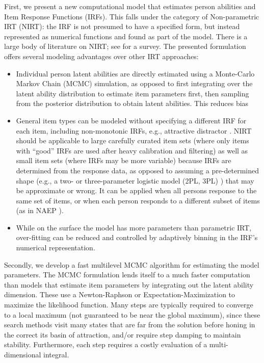 \documentclass{article}
\begin{document}
First, we present a new computational model that estimates person abilities and Item Response Functions (IRFs). This falls under the category of Non-parametric IRT (NIRT): the IRF is not presumed to have a specified form, but instead represented as numerical functions and found as part of the model. There is a large body of literature on NIRT; see \cite{sijtsma} for a survey. The presented formulation offers several modeling advantages over other IRT approaches:
\begin{itemize}
	\item Individual person latent abilities are directly estimated using a Monte-Carlo 
	Markov Chain (MCMC) simulation, as opposed to first integrating over the latent ability distribution to estimate item parameters first, then sampling from the posterior distribution to obtain latent abilities. This reduces bias
	\item General item types can be modeled without specifying a different IRF for each item,
	including non-monotonic IRFs, e.g., attractive distractor \cite{attractive_distractor}. NIRT should be applicable to large carefully curated item sets (where only items with ``good'' IRFs are used after heavy calibration and filtering) as well as small item sets (where IRFs may be more variable) because IRFs are determined from the response data, as opposed to assuming a pre-determined shape (e.g., a two- or three-parameter logistic model (2PL, 3PL) \cite{junker}) that may be approximate or wrong. It can be applied when all persons response to the same set of items, or when each person responds to a different subset of items (as in NAEP \cite{matt02}).
	\item While on the surface the model has more parameters than parametric IRT, over-fitting can be reduced and controlled by adaptively binning in the IRF's numerical representation.
\end{itemize}

Secondly, we develop a fast multilevel MCMC algorithm for estimating the model parameters. The MCMC formulation lends itself to a much faster computation than models that estimate item parameters by integrating out the latent ability dimension. These use a Newton-Raphson \cite{haberman} or Expectation-Maximization to maximize the likelihood function. Many steps are typically required to converge to a local maximum (not guaranteed to be near the global maximum), since these search methods visit many states that are far from the solution before honing in the correct its basin of attraction, and/or require step damping to maintain stability. Furthermore, each step requires a costly evaluation of a multi-dimensional integral.
\end{document}
